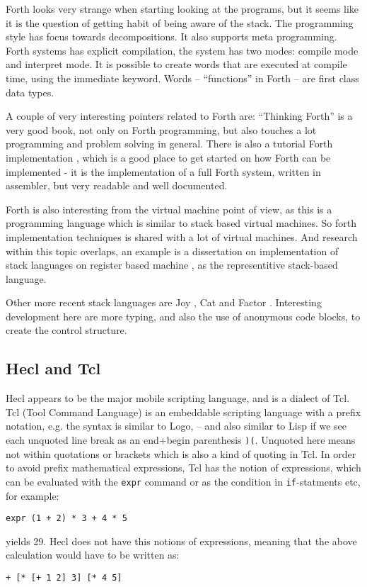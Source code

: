\documentclass[11pt]{report}
\begin{document}
Forth looks very strange when starting looking at the programs, but it seems like it is the question of getting habit of being aware of the stack.
The programming style has focus towards decompositions. It also supports meta programming.
Forth systems has explicit compilation, the system has two modes: compile mode and interpret mode. 
It is possible to create words that are executed at compile time, using the immediate keyword.
Words -- ``functions'' in Forth -- are first class data types.

A couple of very interesting pointers related to Forth are: 
``Thinking Forth'' is a very good book, not only on Forth programming, but also touches a lot programming and problem solving in general.
There is also a tutorial Forth implementation \cite{jonesforth}, which is a good place to get started on how Forth can be implemented - it is the implementation of a full Forth system, written in assembler, but very readable and well documented.

Forth is also interesting from the virtual machine point of view, as this is a programming language which is similar to stack based virtual machines. So forth implementation techniques is shared with a lot of virtual machines. And research within this topic overlaps, an example is a dissertation on implementation of stack languages on register based machine \cite{ertl-dissertation}, as the representitive stack-based language.

Other more recent stack languages are Joy \cite{joy-language}, Cat \cite{cat-language} and Factor \cite{factor-language}.
Interesting development here are more typing, and also the use of anonymous code blocks, 
to create the control structure.


\subsection{Hecl and Tcl}
Hecl appears to be the major mobile scripting language, and is a dialect of Tcl. 
Tcl (Tool Command Language) is an embeddable scripting language \cite{tclbook} with a prefix notation, e.g. the syntax is similar to Logo, -- and also similar to Lisp if we see each unquoted line break as an end+begin parenthesis \verb|)(|. Unquoted here means not within quotations or brackets which is also a kind of quoting in Tcl.
In order to avoid prefix mathematical expressions, Tcl has the notion of expressions, which can be evaluated with the \verb|expr| command or as the condition in \verb|if|-statments etc, for example:
\begin{verbatim}
expr (1 + 2) * 3 + 4 * 5
\end{verbatim}
yields 29. Hecl does not have this notions of expressions, meaning that the above calculation would have to be written as:
\begin{verbatim}
+ [* [+ 1 2] 3] [* 4 5]
\end{verbatim}
\end{document}
